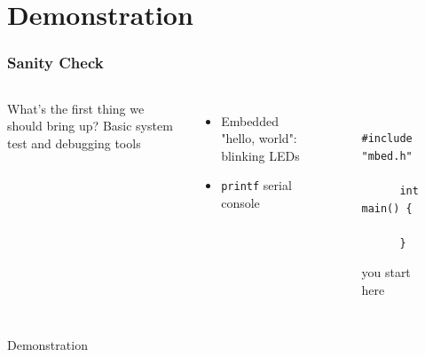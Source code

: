 \documentclass{beamer}
\begin{document}
\section{Demonstration} %
\begin{frame}[fragile]
\frametitle{Sanity Check}
\begin{columns}[t]
  What's the first thing we should bring up?
  \hfill \break
  \hfill \break
   {
  Basic system test and debugging tools
  }
   {
  \begin{itemize}
      \item Embedded "hello, world": blinking LEDs
      \item \texttt{printf} serial console
  \end{itemize}
  }
  \begin{figure}
    \centering
    {\tiny
      \lstset{language=C++}
      \begin{lstlisting}
      #include "mbed.h"

      int main() {
      
      }
      \end{lstlisting}
    }
    you start here
  \end{figure}
\end{columns}
\end{frame}

\begin{frame}
\centering \huge Demonstration
\end{frame}
\end{document}
